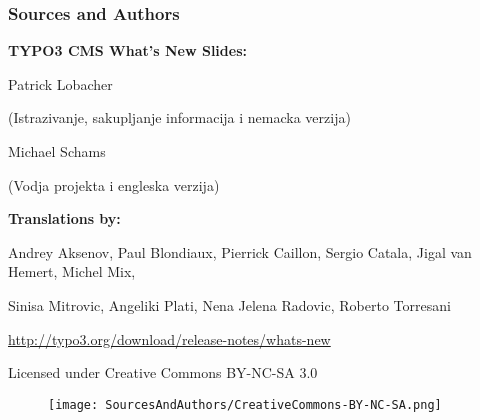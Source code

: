 \begin{frame}[fragile]
	\frametitle{Sources and Authors}

	\vspace{-0.6cm}

	\centerline{\textbf{TYPO3 CMS What's New Slides:}}

	\begin{center}
		\smaller
			\centerline{Patrick Lobacher}
			\centerline{(Istrazivanje, sakupljanje informacija i nemacka verzija)}
			\vspace{0.1cm}
			\centerline{Michael Schams}
			\centerline{(Vodja projekta i engleska verzija)}
		\normalsize
	\end{center}
	\vspace{-0.6cm}
	\begin{center}
		\smaller
			\centerline{\textbf{Translations by:}}
			\centerline{Andrey Aksenov, Paul Blondiaux, Pierrick Caillon, Sergio Catala, Jigal van Hemert, Michel Mix,}
			\centerline{Sinisa Mitrovic, Angeliki Plati, Nena Jelena Radovic, Roberto Torresani}
		\normalsize
	\end{center}
	\vspace{-0.6cm}
	\smaller\begin{center}\url{http://typo3.org/download/release-notes/whats-new}\end{center}\normalsize

	\smaller\begin{center}Licensed under Creative Commons BY-NC-SA 3.0\end{center}\normalsize
	\begin{figure}\vspace*{-0.3cm}
		\texttt{[image: SourcesAndAuthors/CreativeCommons-BY-NC-SA.png]}
	\end{figure}

\end{frame}


